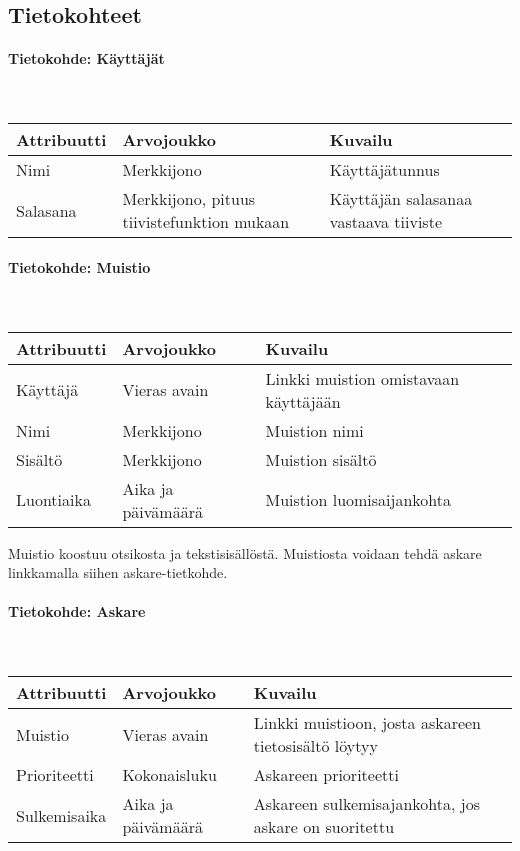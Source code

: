 ﻿\documentclass[finnish]{article}
\begin{document}
\subsection{Tietokohteet}

\paragraph{Tietokohde: Käyttäjät} ~\\

\begin{tabular}{ | l | l | l | }
  \hline
  Attribuutti & Arvojoukko & Kuvailu \\ \hline
  Nimi & Merkkijono & Käyttäjätunnus \\
  Salasana & Merkkijono, pituus tiivistefunktion mukaan & Käyttäjän salasanaa vastaava tiiviste \\
  \hline
\end{tabular}


\paragraph{Tietokohde: Muistio} ~\\

\begin{tabular}{ | l | l | l | }
  \hline
  Attribuutti & Arvojoukko & Kuvailu \\ \hline
  Käyttäjä & Vieras avain & Linkki muistion omistavaan käyttäjään \\
  Nimi & Merkkijono & Muistion nimi \\
  Sisältö & Merkkijono & Muistion sisältö \\
  Luontiaika & Aika ja päivämäärä & Muistion luomisaijankohta \\
  \hline
\end{tabular}

\vspace{5pt}
Muistio koostuu otsikosta ja tekstisisällöstä. Muistiosta voidaan tehdä askare linkkamalla siihen askare-tietkohde.


\paragraph{Tietokohde: Askare} ~\\

\begin{tabular}{ | l | l | l | }
  \hline
  Attribuutti & Arvojoukko & Kuvailu \\ \hline
  Muistio & Vieras avain & Linkki muistioon, josta askareen tietosisältö löytyy \\
  Prioriteetti & Kokonaisluku & Askareen prioriteetti \\
  Sulkemisaika & Aika ja päivämäärä & Askareen sulkemisajankohta, jos askare on suoritettu \\
  \hline
\end{tabular}
\end{document}
